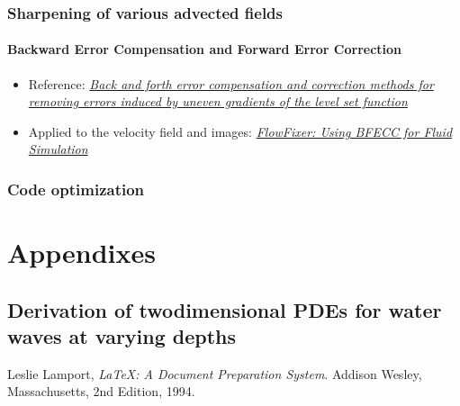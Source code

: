 \documentclass[]{report}
\begin{document}
\section{Sharpening of various advected fields}

\subsection{Backward Error Compensation and Forward Error Correction}

\begin{itemize}
    \item Reference: \textit{\href{http://smartech.gatech.edu/xmlui/bitstream/handle/1853/29473/2002-389.pdf}{Back and forth error compensation and correction methods for removing errors induced by uneven gradients of the level set function}}
    \item Applied to the velocity field and images: \textit{\href{http://www.gvu.gatech.edu/~jarek/papers/FlowFixer.pdf}{FlowFixer: Using BFECC for Fluid Simulation}}
\end{itemize}

\section{Code optimization}


\part{Appendixes}

\appendix
\chapter{Derivation of twodimensional PDEs for water waves at varying depths}


\iffalse




\else

\begin{thebibliography}{99}
    
    Leslie Lamport,
    \emph{\LaTeX: A Document Preparation System}.
    Addison Wesley, Massachusetts,
    2nd Edition,
    1994.
    
\end{thebibliography}

\fi
\end{document}
